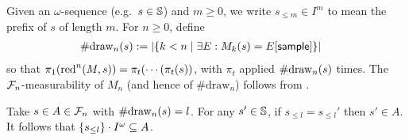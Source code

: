 Given an $\omega$-sequence (e.g.~$s \in {\mathbb{S}}$) and $m \geq 0$, we write $s_{\leq m} \in I^m$ to mean the prefix of $s$ of length $m$.
For $n \geq 0$, define
\begin{align*}
\#\mathrm{draw}_{n}(s) &:= |\{k < n \mid \exists E: M_k(s) = E[\mathsf{sample}]\}|
\end{align*}
so that $\pi_1 (\red^n(M, s)) = %
\pi_t( \cdots (\pi_t (s))$, with $\pi_t$ applied ${\#\mathrm{draw}_{n}(s)}$ times.
The $\mathcal{F}_n$-measurability of $M_n$ (and hence of $\#\mathrm{draw}_n$) follows from \cite{DBLP:conf/icfp/BorgstromLGS16}.
\iffalse
\akr{$\#\mathrm{draw}_n$ is not a stopping time. It doesn't look like you actually use this claim anyway, so it should just be fine to remove, but did you mean something different?} \lo{I agree, and I don't actually use this claim.}
\fi
Take $s \in A \in \mathcal{F}_n$ with $\#\mathrm{draw}_{n}(s) = l$.
For any $s'\in {\mathbb{S}}$, if $s_{\leq l} = s_{\leq l}'$ then $s' \in A$.
It follows that ${\{{s_{\leq l}}\} \cdot I^\omega} \subseteq A$.

